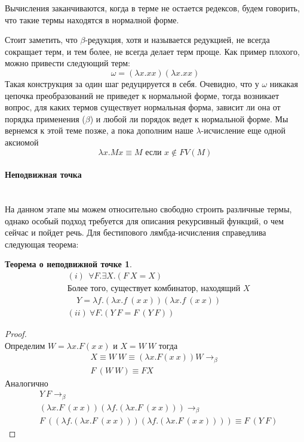 \documentclass[lambda.tex]{subfiles}
\begin{document}
Вычисления заканчиваются, когда в терме не остается редексов, будем говорить, что такие термы находятся в нормалной форме.

Стоит заметить, что $\beta$-редукция, хотя и называется редукцией, не всегда сокращает терм, и тем более, не всегда делает терм проще. Как пример плохого, можно привести следующий терм:
\begin{equation*}
	\omega = (\lambda x.xx)(\lambda x.xx)
\end{equation*}
Такая конструкция за один шаг редуцируется в себя. Очевидно, что у $\omega$ никакая цепочка преобразований не приведет к нормальной форме, тогда возникает вопрос, для каких термов существует нормальная форма, зависит ли она от порядка применения ($\beta$) и любой ли порядок ведет к нормальной форме. Мы вернемся к этой теме позже, а пока дополним наше $\lambda$-исчисление еще одной аксиомой
\begin{equation*}
	\lambda x.Mx \equiv M \text{ если }x \not\in FV(M) \tag{$\eta$}
\end{equation*}


\paragraph{Неподвижная точка} %
\label{par:fix point}
~\\

На данном этапе мы можем относительно свободно строить различные термы, однако особый подход требуется для описания рекурсивный функций, о чем сейчас и пойдет речь. Для бестипового лямбда-исчисления справедлива следующая теорема:
\newtheorem*{fixpoint}{Теорема о неподвижной точке}
\begin{fixpoint}
\begin{align*}
&(i)\ \ \forall F. \exists X. (F\ X = X) \\
&\text{Более того, существует комбинатор, находящий $X$}\\
&\ \ \ \ \ Y = \lambda f.(\lambda x.f\ (x\ x)) (\lambda x.f\ (x\ x))\\
&(ii)\ \forall F.(Y\ F=F\ (Y\ F))
\end{align*}
\end{fixpoint}

\begin{proof}
~\\
Определим $W = \lambda x.F(x\ x)$ и $X = W\ W$ тогда
\begin{align*}
X \equiv W\ W \equiv (\lambda x.F(x\ x))W \rightarrow_\beta\\
F\ (W\ W) \equiv F X
\end{align*}
Аналогично
\begin{align*}
&Y\ F \rightarrow_\beta\\
&(\lambda x.F\ (x\ x)) (\lambda f.(\lambda x.F\ (x\ x))) \rightarrow_\beta\\
&F\ ((\lambda f.(\lambda x.F\ (x\ x))) (\lambda f.(\lambda x.F\ (x\ x)))) \equiv F\ (Y\ F)
\end{align*}
\end{proof}
\end{document}
